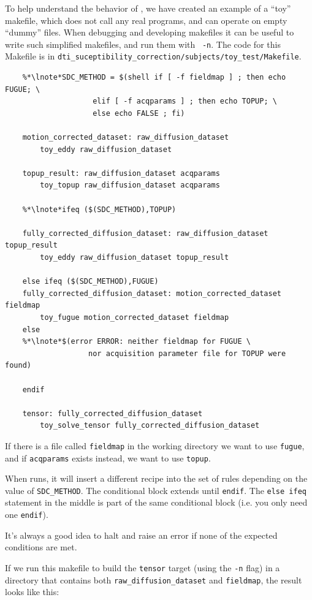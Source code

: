To help understand the behavior of \maken{}, we have created an
example of a ``toy'' makefile, which does not call any real programs,
and can operate on empty ``dummy'' files. When debugging and
developing makefiles it can be useful to write such simplified
makefiles, and run them with \maken{}~\texttt{-n}. The code for this
Makefile is in \texttt{dti_suceptibility_correction/subjects/toy_test/Makefile}.


\begin{lstlisting}
	%*\lnote*SDC_METHOD = $(shell if [ -f fieldmap ] ; then echo FUGUE; \
                    elif [ -f acqparams ] ; then echo TOPUP; \
                    else echo FALSE ; fi)

	motion_corrected_dataset: raw_diffusion_dataset
	    toy_eddy raw_diffusion_dataset

	topup_result: raw_diffusion_dataset acqparams
	    toy_topup raw_diffusion_dataset acqparams

	%*\lnote*ifeq ($(SDC_METHOD),TOPUP)

	fully_corrected_diffusion_dataset: raw_diffusion_dataset topup_result
	    toy_eddy raw_diffusion_dataset topup_result

	else ifeq ($(SDC_METHOD),FUGUE)
	fully_corrected_diffusion_dataset: motion_corrected_dataset fieldmap
	    toy_fugue motion_corrected_dataset fieldmap
	else
	%*\lnote*$(error ERROR: neither fieldmap for FUGUE \
	               nor acquisition parameter file for TOPUP were found)

	endif

	tensor: fully_corrected_diffusion_dataset
	    toy_solve_tensor fully_corrected_diffusion_dataset

\end{lstlisting}


If there is a file called \texttt{fieldmap} in the working directory we want to use \texttt{fugue}, and if \texttt{acqparams} exists instead, we want to use \texttt{topup}.

When \maken{} runs, it will insert a different recipe into the set of rules depending on the value of \texttt{SDC_METHOD}. The conditional block extends until \texttt{endif}. The \texttt{else ifeq} statement in the middle is part of the same conditional block (i.e. you only need one \texttt{endif}).

It's always a good idea to halt and raise an error if none of the expected conditions are met. \break

If we run this makefile to build the \texttt{tensor} target (using the \texttt{-n} flag) in a directory that contains both \texttt{raw_diffusion_dataset} and \texttt{fieldmap}, the result looks like this:


